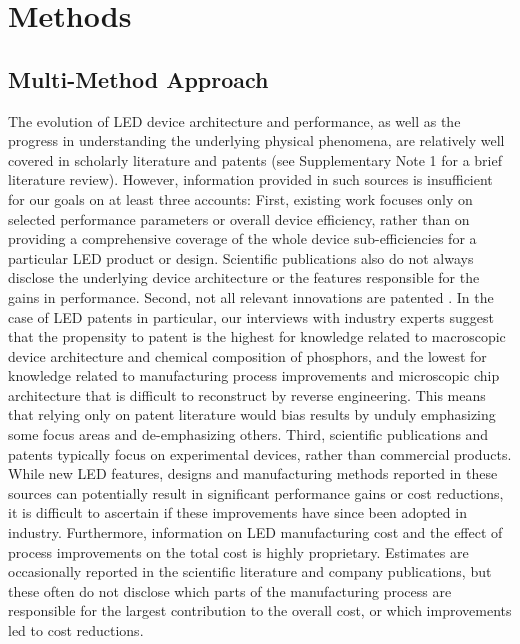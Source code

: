\documentclass[parskip=full]{article}
\begin{document}
\section{Methods}

\subsection{Multi-Method Approach}

The evolution of LED device architecture and performance, as well as the progress in understanding the underlying physical phenomena, are relatively well covered in scholarly literature and patents (see Supplementary Note 1 for a brief literature review). However, information provided in such sources is insufficient for our goals on at least three accounts: First, existing work focuses only on selected performance parameters or overall device efficiency, rather than on providing a comprehensive coverage of the whole device sub-efficiencies for a particular LED product or design. Scientific publications also do not always disclose the underlying device architecture or the features responsible for the gains in performance. Second, not all relevant innovations are patented \cite{Pakes_1980,Fontana_2013}. In the case of LED patents in particular, our interviews with industry experts suggest that the propensity to patent is the highest for knowledge related to macroscopic device architecture and chemical composition of phosphors, and the lowest for knowledge related to manufacturing process improvements and microscopic chip architecture that is difficult to reconstruct by reverse engineering. This means that relying only on patent literature would bias results by unduly emphasizing some focus areas and de-emphasizing others. Third, scientific publications and patents typically focus on experimental devices, rather than commercial products. While new LED features, designs and manufacturing methods reported in these sources can potentially result in significant performance gains or cost reductions, it is difficult to ascertain if these improvements have since been adopted in industry. Furthermore, information on LED manufacturing cost and the effect of process improvements on the total cost is highly proprietary. Estimates are occasionally reported in the scientific literature and company publications, but these often do not disclose which parts of the manufacturing process are responsible for the largest contribution to the overall cost, or which improvements led to cost reductions.
\end{document}

